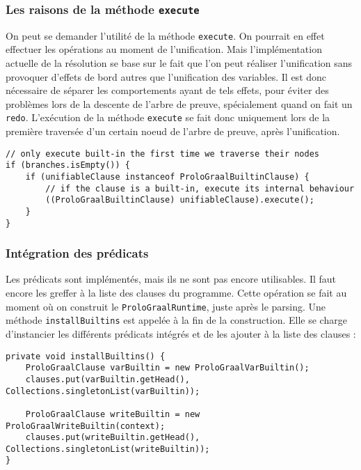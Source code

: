 \documentclass[../report.tex]{subfiles}
\begin{document}
\subsubsection{Les raisons de la méthode \texttt{execute}}
On peut se demander l'utilité de la méthode \texttt{execute}. On pourrait en effet effectuer les opérations au moment de l'unification. Mais l'implémentation actuelle de la résolution se base sur le fait que l'on peut réaliser l'unification sans provoquer d'effets de bord autres que l'unification des variables. Il est donc nécessaire de séparer les comportements ayant de tels effets, pour éviter des problèmes lors de la descente de l'arbre de preuve, spécialement quand on fait un \texttt{redo}. L'exécution de la méthode \texttt{execute} se fait donc uniquement lors de la première traversée d'un certain noeud de l'arbre de preuve, après l'unification.
\begin{verbatim}
// only execute built-in the first time we traverse their nodes
if (branches.isEmpty()) {
    if (unifiableClause instanceof ProloGraalBuiltinClause) {
        // if the clause is a built-in, execute its internal behaviour
        ((ProloGraalBuiltinClause) unifiableClause).execute();
    }
}
\end{verbatim}
\subsubsection{Intégration des prédicats}
Les prédicats sont implémentés, mais ils ne sont pas encore utilisables. Il faut encore les greffer à la liste des clauses du programme. Cette opération se fait au moment où on construit le \texttt{ProloGraalRuntime}, juste après le parsing. Une méthode \texttt{installBuiltins} est appelée à la fin de la construction. Elle se charge d'instancier les différents prédicats intégrés et de les ajouter à la liste des clauses :
\begin{verbatim}
private void installBuiltins() {
    ProloGraalClause varBuiltin = new ProloGraalVarBuiltin();
    clauses.put(varBuiltin.getHead(), Collections.singletonList(varBuiltin));

    ProloGraalClause writeBuiltin = new ProloGraalWriteBuiltin(context);
    clauses.put(writeBuiltin.getHead(), Collections.singletonList(writeBuiltin));
}
\end{verbatim}
\end{document}
